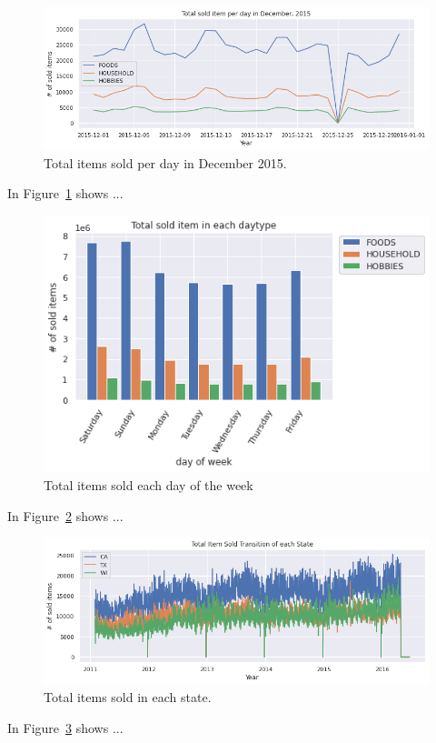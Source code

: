 \documentclass[10pt,twocolumn,letterpaper]{article}
\begin{document}
\begin{figure}
  \begin{center}
    \includegraphics[width=0.8\linewidth]{img/totalSoldItemPerDayDec2015.png}
  \end{center}
    \caption{Total items sold per day in December 2015.}
  \label{fig:totalSoldItemPerDayDec2015}
\end{figure}
In Figure~\ref{fig:totalSoldItemPerDayDec2015} shows ...


\begin{figure}
  \begin{center}
    \includegraphics[width=0.8\linewidth]{img/totalSoldItemInEachDayOfWeek.png}
  \end{center}
    \caption{Total items sold each day of the week}
  \label{fig:totalSoldItemInEachDayOfWeek}
\end{figure}
In Figure~\ref{fig:totalSoldItemInEachDayOfWeek} shows ...


\begin{figure}
  \begin{center}
    \includegraphics[width=0.8\linewidth]{img/totalItemSoldInEachState.png}
  \end{center}
    \caption{Total items sold in each state.}
  \label{fig:totalItemSoldInEachState}
\end{figure}
In Figure~\ref{fig:totalItemSoldInEachState} shows ...
\end{document}
